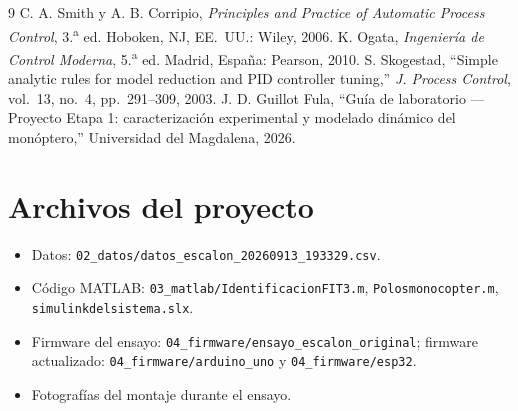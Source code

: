 \documentclass[conference,10pt]{IEEEtran}
\begin{document}
\begin{thebibliography}{9}
 C. A. Smith y A. B. Corripio, \textit{Principles and Practice of Automatic Process Control}, 3.\textsuperscript{a} ed. Hoboken, NJ, EE.~UU.: Wiley, 2006.
 K. Ogata, \textit{Ingeniería de Control Moderna}, 5.\textsuperscript{a} ed. Madrid, España: Pearson, 2010.
 S. Skogestad, ``Simple analytic rules for model reduction and PID controller tuning,'' \textit{J. Process Control}, vol.~13, no.~4, pp.~291--309, 2003.
 J. D. Guillot Fula, ``Guía de laboratorio — Proyecto Etapa 1: caracterización experimental y modelado dinámico del monóptero,'' Universidad del Magdalena, 2026.
\end{thebibliography}

\appendices
\section{Archivos del proyecto}
\begin{itemize}
\item Datos: \texttt{02\_datos/datos\_escalon\_20260913\_193329.csv}.
\item Código MATLAB: \texttt{03\_matlab/IdentificacionFIT3.m}, \texttt{Polosmonocopter.m}, \texttt{simulinkdelsistema.slx}.
\item Firmware del ensayo: \texttt{04\_firmware/ensayo\_escalon\_original}; firmware actualizado: \texttt{04\_firmware/arduino\_uno} y \texttt{04\_firmware/esp32}.
\item [COMPLETAR] Fotografías del montaje durante el ensayo.
\end{itemize}
\end{document}
